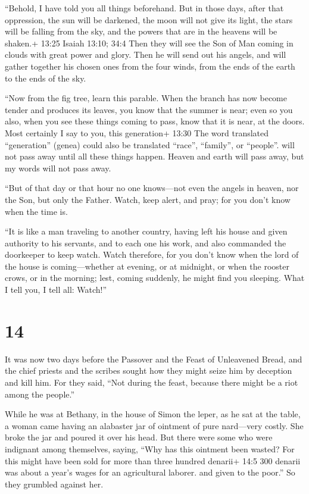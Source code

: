 ``Behold, I have told you all things beforehand.  But in
those days, after that oppression, the sun will be darkened, the moon
will not give its light,  the stars will be falling from
the sky, and the powers that are in the heavens will be shaken.+ 13:25
Isaiah 13:10; 34:4  Then they will see the Son of Man
coming in clouds with great power and glory.  Then he will
send out his angels, and will gather together his chosen ones from the
four winds, from the ends of the earth to the ends of the sky.

 ``Now from the fig tree, learn this parable. When the
branch has now become tender and produces its leaves, you know that the
summer is near;  even so you also, when you see these
things coming to pass, know that it is near, at the doors. 
Most certainly I say to you, this generation+ 13:30 The word translated
``generation'' (genea) could also be translated ``race'', ``family'', or
``people''. will not pass away until all these things happen.
 Heaven and earth will pass away, but my words will not
pass away.

 ``But of that day or that hour no one knows---not even the
angels in heaven, nor the Son, but only the Father.  Watch,
keep alert, and pray; for you don't know when the time is.

 ``It is like a man traveling to another country, having
left his house and given authority to his servants, and to each one his
work, and also commanded the doorkeeper to keep watch. 
Watch therefore, for you don't know when the lord of the house is
coming---whether at evening, or at midnight, or when the rooster crows,
or in the morning;  lest, coming suddenly, he might find
you sleeping.  What I tell you, I tell all: Watch!''

\hypertarget{section-13}{%
\section{14}\label{section-13}}

 It was now two days before the Passover and the Feast of
Unleavened Bread, and the chief priests and the scribes sought how they
might seize him by deception and kill him.  For they said,
``Not during the feast, because there might be a riot among the
people.''

 While he was at Bethany, in the house of Simon the leper,
as he sat at the table, a woman came having an alabaster jar of ointment
of pure nard---very costly. She broke the jar and poured it over his
head.  But there were some who were indignant among
themselves, saying, ``Why has this ointment been wasted? 
For this might have been sold for more than three hundred denarii+ 14:5
300 denarii was about a year's wages for an agricultural laborer. and
given to the poor.'' So they grumbled against her.

